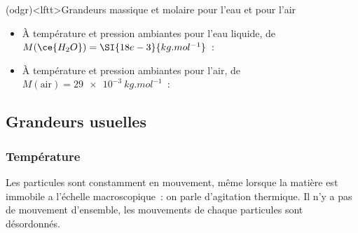 \documentclass[../../main/main.tex]{subfiles}
\begin{document}
\begin{tcb*}(odgr)<lftt>{Grandeurs massique et molaire pour l'eau et pour l'air}
	\begin{itemize}
		\item À température et pression ambiantes pour l'eau liquide, de $M(\ce{H_2O}) =
			      \SI{18e-3}{kg.mol^{-1}}$~:
		      \psw{%
		      \[
			      \rho = \SI{1.0e3}{kg.m^{-3}}
			      \qquad
			      v = \frac{V}{m} = \SI{1.0e-3}{m^3.kg^{-1}}
			      \qquad
			      V_m = \frac{V}{n} = \SI{1.8e-3}{L.mol^{-1}}
		      \]
		      }%
		\item À température et pression ambiantes pour l'air, de $M(\text{air}) =
			      \SI{29e-3}{kg.mol^{-1}}$~:
		      \psw{%
		      \[
			      \rho = \SI{1.23}{kg.m^{-3}}
			      \qquad
			      v = \frac{V}{m} = \SI{0.77}{m^3.kg^{-1}}
			      \qquad
			      V_m = \frac{V}{n} = \SI{24}{L.mol^{-1}}
		      \]
		      }%
		      \vspace*{-15pt}
	\end{itemize}
	\vspace*{-15pt}
\end{tcb*}

\subsection{Grandeurs usuelles}
\subsubsection{Température}
Les particules sont constamment en mouvement, même lorsque la matière est
immobile a l'échelle macroscopique~: on parle d'agitation thermique. Il n'y a
pas de mouvement d'ensemble, les mouvements de chaque particules sont
désordonnés.
\end{document}

